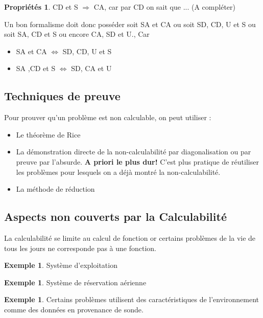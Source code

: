 \documentclass[11pt,a4paper]{article}
\theoremstyle{definition}
\newtheorem{myprop}[mydef]{Propriétés}
\newtheorem{myexem}[mydef]{Exemple}
\begin{document}
\begin{myprop}
	CD et S $\Rightarrow$ CA, car par CD on sait que ... (A compléter)
\end{myprop}

Un bon formalisme doit donc posséder soit SA et CA ou soit SD, CD, U et S ou 
soit SA, CD et S ou encore CA, SD et U., Car
\begin{itemize}
	\item SA et CA $\iff$ SD, CD, U et S
	\item SA ,CD et S $\iff$ SD, CA et U
\end{itemize}

\subsection{Techniques de preuve}
\label{sub:techniques_de_preuve}

Pour prouver qu'un problème est non calculable, on peut utiliser :
\begin{itemize}
	\item Le théorème de Rice
	\item La démonstration directe de la non-calculabilité par 
		diagonalisation ou par preuve par l'absurde. 
		\textbf{A priori le plus dur!} C'est plus pratique de réutiliser les problèmes pour 
		lesquels on a déjà montré la non-calculabilité.
	\item La méthode de réduction
\end{itemize}

\subsection{Aspects non couverts par la Calculabilité}
\label{sub:aspects_non_couvert_par_la_calculabilit_}
La calculabilité se limite au calcul de fonction or certains problèmes de la vie 
de tous les jours ne corresponde pas à une fonction.

\begin{myexem}
	Système d'exploitation
\end{myexem}

\begin{myexem}
	Système de réservation aérienne
\end{myexem}

\begin{myexem}
	Certains problèmes utilisent des caractéristiques de l'environnement comme 
	des données en provenance de sonde.
\end{myexem}
\end{document}
